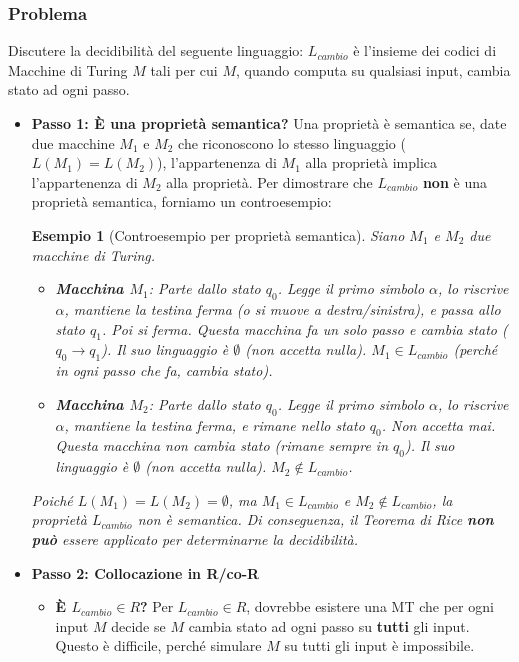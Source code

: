 \documentclass[a4paper]{article}
\newtheorem{example}{Esempio}
\begin{document}
\subsubsection{Problema}
Discutere la decidibilità del seguente linguaggio: $L_{cambio}$ è l'insieme dei codici di Macchine di Turing $M$ tali per cui $M$, quando computa su qualsiasi input, cambia stato ad ogni passo.
\begin{itemize}
    \item \textbf{Passo 1: È una proprietà semantica?}
    Una proprietà è semantica se, date due macchine $M_1$ e $M_2$ che riconoscono lo stesso linguaggio ($L(M_1) = L(M_2)$), l'appartenenza di $M_1$ alla proprietà implica l'appartenenza di $M_2$ alla proprietà.
    Per dimostrare che $L_{cambio}$ \textbf{non} è una proprietà semantica, forniamo un controesempio:
    \begin{example}[Controesempio per proprietà semantica]
        Siano $M_1$ e $M_2$ due macchine di Turing.
        \begin{itemize}
            \item \textbf{Macchina $M_1$}:
            Parte dallo stato $q_0$. Legge il primo simbolo $\alpha$, lo riscrive $\alpha$, mantiene la testina ferma (o si muove a destra/sinistra), e passa allo stato $q_1$. Poi si ferma.
            Questa macchina fa un solo passo e cambia stato ($q_0 \to q_1$). Il suo linguaggio è $\emptyset$ (non accetta nulla). $M_1 \in L_{cambio}$ (perché in ogni passo che fa, cambia stato).
            \item \textbf{Macchina $M_2$}:
            Parte dallo stato $q_0$. Legge il primo simbolo $\alpha$, lo riscrive $\alpha$, mantiene la testina ferma, e rimane nello stato $q_0$. Non accetta mai.
            Questa macchina non cambia stato (rimane sempre in $q_0$). Il suo linguaggio è $\emptyset$ (non accetta nulla). $M_2 \notin L_{cambio}$.
        \end{itemize}
        Poiché $L(M_1) = L(M_2) = \emptyset$, ma $M_1 \in L_{cambio}$ e $M_2 \notin L_{cambio}$, la proprietà $L_{cambio}$ non è semantica. Di conseguenza, il Teorema di Rice \textbf{non può} essere applicato per determinarne la decidibilità.
    \end{example}

    \item \textbf{Passo 2: Collocazione in R/co-R}
    \begin{itemize}
        \item \textbf{È $L_{cambio} \in R$?}
        Per $L_{cambio} \in R$, dovrebbe esistere una MT che per ogni input $M$ decide se $M$ cambia stato ad ogni passo su \textbf{tutti} gli input. Questo è difficile, perché simulare $M$ su tutti gli input è impossibile.


\end{itemize}
\end{itemize}
\end{document}

